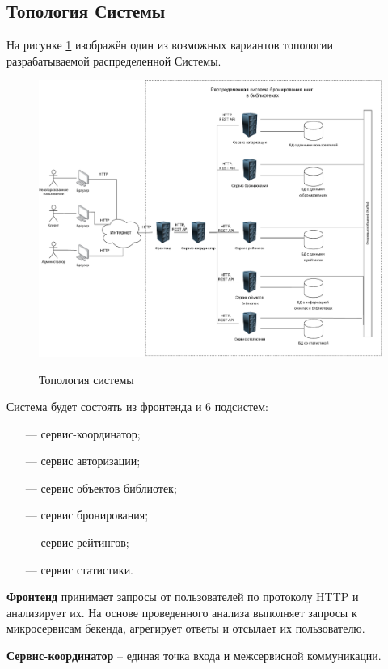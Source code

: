 \documentclass[a4paper, 12pt]{article}
\begin{document}
\begin{large}
\subsection{Топология Системы}
На рисунке \ref{fig:topology} изображён один из возможных вариантов топологии разрабатываемой распределенной Системы.
\begin{figure}[h]
	\begin{center}
		{\includegraphics[scale = 0.5]{img/topology.pdf}}
		\caption{Топология системы}
		\label{fig:topology}
	\end{center}
\end{figure}

Система будет состоять из фронтенда и 6 подсистем:
\begin{itemize}
	\item[---] сервис-координатор;
	\item[---] сервис авторизации;
	\item[---] сервис объектов библиотек;
	\item[---] сервис бронирования;
	\item[---] сервис рейтингов;
    \item[---] сервис статистики.
\end{itemize}
%
\textbf{Фронтенд} принимает запросы от пользователей по протоколу HTTP и анализирует их. На основе проведенного анализа выполняет запросы к микросервисам бекенда, агрегирует ответы и отсылает их пользователю. 

\textbf{Сервис-координатор} -- единая точка входа и межсервисной коммуникации. 


\end{large}
\end{document}
